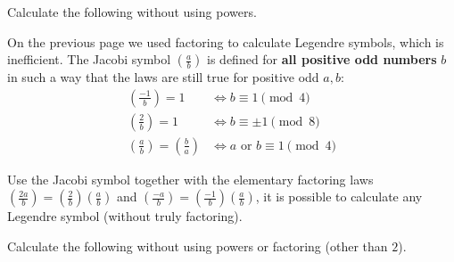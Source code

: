 \documentclass[12pt]{exam}
\begin{document}
\begin{questions}
  Calculate the following without using powers.
  \newpage
  \question On the previous page we used factoring to calculate Legendre symbols, which is inefficient. The Jacobi symbol $(\frac ab)$ is defined for \textbf{all positive odd numbers} $b$ in such a way that the laws are still true for positive odd $a,b$:
  \begin{align*}
    \left(\frac{-1}b\right)=1\quad&\iff b\equiv1\pmod{4}\\
    \left(\frac2b\right)=1\quad&\iff b\equiv\pm1\pmod{8}\\
    \left(\frac ab\right)=\left(\frac ba\right)&\iff a\text{ or }b\equiv1\pmod{4}
  \end{align*}
  
  Use the Jacobi symbol together with the elementary factoring laws $(\frac{2a}{b})=(\frac2b)(\frac ab)$ and $(\frac{-a}{b})=(\frac{-1}{b})(\frac ab)$, it is possible to calculate any Legendre symbol (without truly factoring).
  
  Calculate the following without using powers or factoring (other than $2$).
\end{questions}
\end{document}
